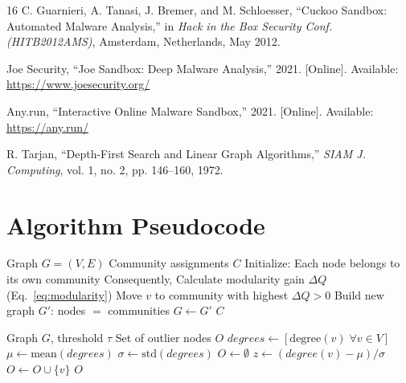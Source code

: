 \documentclass[conference]{IEEEtran}
\begin{document}
\begin{thebibliography}{16}
C. Guarnieri, A. Tanasi, J. Bremer, and M. Schloesser, ``Cuckoo Sandbox: Automated Malware Analysis,'' in \textit{Hack in the Box Security Conf. (HITB2012AMS)}, Amsterdam, Netherlands, May 2012.

Joe Security, ``Joe Sandbox: Deep Malware Analysis,'' 2021. [Online]. Available: \url{https://www.joesecurity.org/}

Any.run, ``Interactive Online Malware Sandbox,'' 2021. [Online]. Available: \url{https://any.run/}

R. Tarjan, ``Depth-First Search and Linear Graph Algorithms,'' \textit{SIAM J. Computing}, vol. 1, no. 2, pp. 146--160, 1972.

\end{thebibliography}

\appendices

\section{Algorithm Pseudocode}

\begin{algorithm}[htbp]
\caption{Louvain Community Detection}
\label{alg:louvain}
\begin{algorithmic}[1]
\REQUIRE Graph $G = (V, E)$
\ENSURE Community assignments $C$
\STATE Initialize: Each node belongs to its own community
\REPEAT
            \STATE Consequently, Calculate modularity gain $\Delta Q$ (Eq.~\ref{eq:modularity})
        \ENDFOR
        \STATE Move $v$ to community with highest $\Delta Q > 0$
    \ENDFOR
    \STATE Build new graph $G'$: nodes $=$ communities
    \STATE $G \leftarrow G'$
\RETURN $C$
\end{algorithmic}
\end{algorithm}

\begin{algorithm}[htbp]
\caption{Z-Score Degree Anomaly Detection}
\label{alg:zscore}
\begin{algorithmic}[1]
\REQUIRE Graph $G$, threshold $\tau$
\ENSURE Set of outlier nodes $O$
\STATE $degrees \leftarrow [\text{degree}(v) \; \forall v \in V]$
\STATE $\mu \leftarrow \text{mean}(degrees)$
\STATE $\sigma \leftarrow \text{std}(degrees)$
\STATE $O \leftarrow \emptyset$
    \STATE $z \leftarrow (degree(v) - \mu) / \sigma$
        \STATE $O \leftarrow O \cup \{v\}$
    \ENDIF
\ENDFOR
\RETURN $O$
\end{algorithmic}
\end{algorithm}
\end{document}
